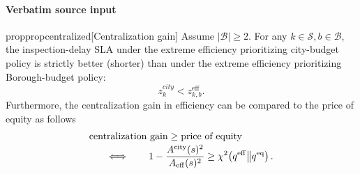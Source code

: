 \documentclass[10pt]{article}
\begin{document}
\paragraph{Verbatim source input}
\begin{ReviewVerbatim}
\begin{restatable}{prop}{propcentralized}[Centralization gain]
\label{prop:strict_improvements_from_centralization}
Assume $|\mathcal B|\geq2$.
For any $k\in \mathcal{S}, b\in \mathcal{B}$, the inspection-delay SLA under the extreme efficiency prioritizing city-budget policy is strictly better (shorter) than under the extreme efficiency prioritizing Borough-budget policy:
\begin{equation}
z^{city}_{k} < z^{\mathrm{eff}}_{k,b}.
\label{eq:pooling-sla-dominance}
\end{equation}
Furthermore, the centralization gain in efficiency can be compared to the price of equity as follows
\begin{equation}
\begin{aligned}
  &{\textnormal{centralization gain}
    \geq\textnormal{price of equity}}\\[-2pt]
  &{\qquad\Longleftrightarrow\qquad
    1-\frac{A^{\mathrm{city}}(s)^2}{A_{\mathrm{eff}}(s)^2}
    \geq\chi^2\!\left(
    q^{\mathrm{eff}}\middle\|q^{\mathrm{eq}}\right).}
\end{aligned}
\end{equation}
\end{restatable}
\end{ReviewVerbatim}
\end{document}
